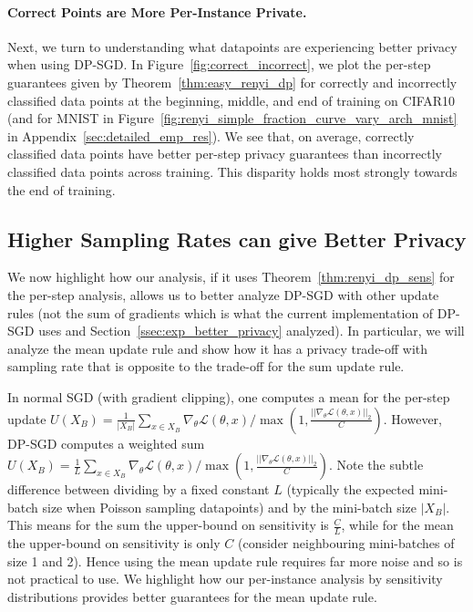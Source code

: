\paragraph{Correct Points are More Per-Instance Private.} Next, we turn to understanding what datapoints are experiencing better privacy when using DP-SGD. In Figure~\ref{fig:correct_incorrect}, we plot the per-step guarantees given by Theorem~\ref{thm:easy_renyi_dp} for correctly and incorrectly classified data points at the beginning, middle, and end of training
on CIFAR10 (and for MNIST in Figure~\ref{fig:renyi_simple_fraction_curve_vary_arch_mnist} in Appendix~\ref{sec:detailed_emp_res}). We see that, on average, correctly classified data points have better per-step privacy guarantees than incorrectly classified data points across training. This disparity holds most strongly towards the end of training.










\subsection{Higher Sampling Rates can give Better Privacy}
\label{ssec:exp_hard_renyi}

We now highlight how our analysis, if it uses Theorem~\ref{thm:renyi_dp_sens} for the per-step analysis, allows us to better analyze DP-SGD with other update rules (not the sum of gradients which is what the current implementation of DP-SGD uses and Section~\ref{ssec:exp_better_privacy} analyzed). In particular, we will analyze the mean update rule and show how it has a privacy trade-off with sampling rate that is opposite to the trade-off for the sum update rule.

In normal SGD (with gradient clipping), one computes a mean for the per-step update 
$U(X_B) = \frac{1}{|X_B|}\sum_{x \in X_B} \nabla_{\theta}\mathcal{L}(\theta,x)/ \max(1,\frac{||\nabla_{\theta}\mathcal{L}(\theta,x)||_2}{C})$. 
However, DP-SGD computes a weighted sum $U(X_B) = \frac{1}{L} \sum_{x \in X_B} \nabla_{\theta}\mathcal{L}(\theta,x)/ \max(1,\frac{||\nabla_{\theta}\mathcal{L}(\theta,x)||_2}{C})$. Note the subtle difference between dividing by a fixed constant $L$ (typically the expected mini-batch size when Poisson sampling datapoints) and by the mini-batch size $|X_B|$. This means for the sum the upper-bound on sensitivity is $\frac{C}{L}$, while for the mean the upper-bound on sensitivity is only $C$ (consider neighbouring mini-batches of size 1 and 2). Hence using the mean update rule requires far more noise and so is not practical to use. We highlight how our per-instance analysis by sensitivity distributions provides better guarantees for the mean update rule.


